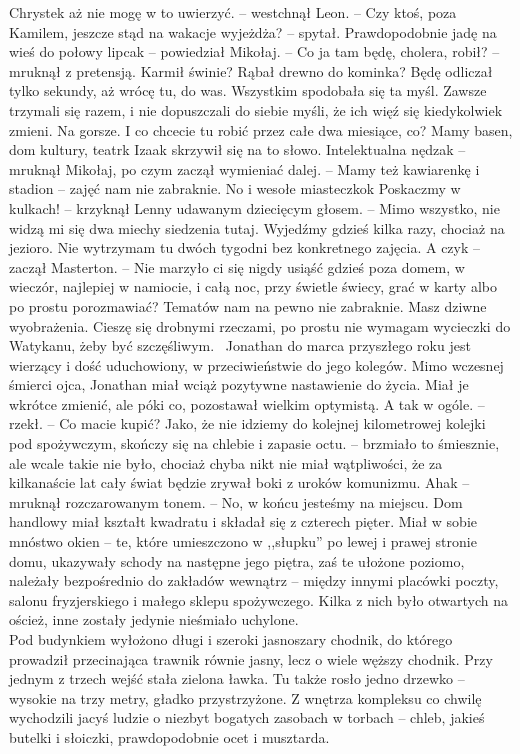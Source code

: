 \documentclass[../MAIN.tex]{subfiles}
\begin{document}
%
\sx Chryste\3k aż nie mogę w to uwierzyć. -- westchnął Leon. -- Czy ktoś, poza Kamilem, jeszcze stąd na wakacje wyjeżdża? -- spytał.
\xx Prawdopodobnie jadę na wieś do połowy lipca\3k -- powiedział Mikołaj. -- Co ja tam będę, cholera, robił? -- mruknął z pretensją. \x Karmił świnie? Rąbał drewno do kominka? Będę odliczał tylko sekundy, aż wrócę tu, do was.
\qd
Wszystkim spodobała się ta myśl. Zawsze trzymali się razem, i nie dopuszczali do siebie myśli, że ich więź się kiedykolwiek zmieni. Na gorsze.
\sx I co chcecie tu robić przez całe dwa miesiące, co?
\xx Mamy basen, dom kultury, teatr\3k
\qd
Izaak skrzywił się na to słowo.
\sx Intelektualna nędza\3k -- mruknął Mikołaj, po czym zaczął wymieniać dalej. -- Mamy też kawiarenkę i stadion -- zajęć nam nie zabraknie. No i wesołe miasteczko\3k
\xx Poskaczmy w kulkach! -- krzyknął Lenny udawanym dziecięcym głosem. -- Mimo wszystko, nie widzą mi się dwa miechy siedzenia tutaj. Wyjedźmy gdzieś kilka razy, chociaż na jezioro. Nie wytrzymam tu dwóch tygodni bez konkretnego zajęcia.
\xx A czy\3k -- zaczął Masterton. -- Nie marzyło ci się nigdy usiąść gdzieś poza domem, w wieczór, najlepiej w namiocie, i całą noc, przy świetle świecy, grać w karty albo po prostu porozmawiać? Tematów nam na pewno nie zabraknie.
\xx Masz dziwne wyobrażenia.
\xx Cieszę się drobnymi rzeczami, po prostu nie wymagam wycieczki do Watykanu, żeby być szczęśliwym.\
\qd
Jonathan do marca przyszłego roku jest wierzący i dość uduchowiony, w przeciwieństwie do jego kolegów. Mimo wczesnej śmierci ojca, Jonathan miał wciąż pozytywne nastawienie do życia. Miał je wkrótce zmienić, ale póki co, pozostawał wielkim optymistą.
\sx A tak w ogóle. -- rzekł. -- Co macie kupić?
\xx Jako, że nie idziemy do kolejnej kilometrowej kolejki pod spożywczym, skończy się na chlebie i zapasie octu. -- brzmiało to śmiesznie, ale wcale takie nie było, chociaż chyba nikt nie miał wątpliwości, że za kilkanaście lat cały świat będzie zrywał boki z uroków komunizmu.
\xx Aha\3k -- mruknął rozczarowanym tonem. -- No, w końcu jesteśmy na miejscu.
\qd
Dom handlowy miał kształt kwadratu i składał się z czterech pięter. Miał w sobie mnóstwo okien -- te, które umieszczono w ,,słupku'' po lewej i prawej stronie domu, ukazywały schody na następne jego piętra, zaś te ułożone poziomo, należały bezpośrednio do zakładów wewnątrz -- między innymi placówki poczty, salonu fryzjerskiego i małego sklepu spożywczego. Kilka z nich było otwartych na oścież, inne zostały jedynie nieśmiało uchylone.\\
Pod budynkiem wyłożono długi i szeroki jasnoszary chodnik, do którego prowadził przecinająca trawnik równie jasny, lecz o wiele węższy chodnik. Przy jednym z trzech wejść stała zielona ławka. Tu także rosło jedno drzewko -- wysokie na trzy metry, gładko przystrzyżone. Z wnętrza kompleksu co chwilę wychodzili jacyś ludzie o niezbyt bogatych zasobach w torbach -- chleb, jakieś butelki i słoiczki, prawdopodobnie ocet i musztarda.
\end{document}
